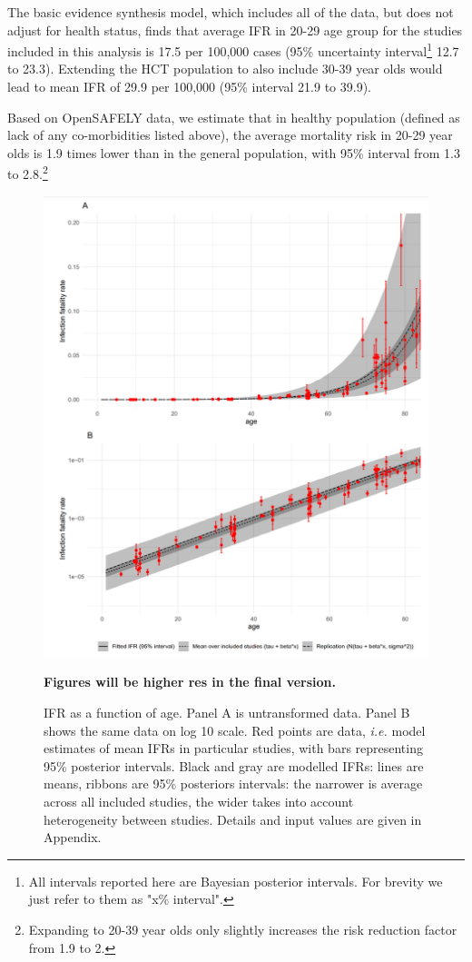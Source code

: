\documentclass{article}
\begin{document}
The basic evidence synthesis model, which includes all of the data, but does not adjust for health status, finds that average IFR in 20-29 age group for the studies included in this analysis is 17.5 per 100,000 cases (95\% uncertainty interval\footnote{All intervals reported here are Bayesian posterior intervals. For brevity we just refer to them as "x\% interval".} 12.7 to 23.3). 
Extending the HCT population to also include 30-39 year olds would lead to mean IFR of 29.9 per 100,000 (95\% interval 21.9 to 39.9).

Based on OpenSAFELY data, we estimate that in healthy population (defined as lack of any co-morbidities listed above), the average mortality risk in
20-29 year olds is 1.9 times lower than in the general population, with 95\%  interval from 1.3 to 2.8.\footnote{Expanding to 20-39 year olds only slightly increases the risk reduction factor from 1.9 to 2.}

\begin{figure}
    \centering
    \includegraphics[width=12cm]{risk_estimate_fig1.png}
    \caption{IFR as a function of age. Panel A is untransformed data. Panel B shows the same data on log 10 scale. Red points are data, \textit{i.e.} model estimates of mean IFRs in particular studies, with bars representing 95\% posterior intervals. Black and gray are modelled IFRs: lines are means, ribbons are 95\% posteriors intervals: the narrower is average across all included studies, the wider takes into account heterogeneity between studies. Details and input values are given in Appendix.}
    \label{fig:my_label}
\textbf{Figures will be higher res in the final version.}
\end{figure}
\end{document}
